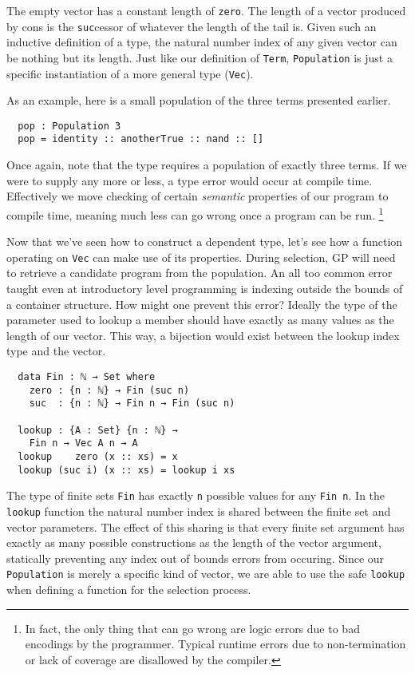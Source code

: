 \documentclass{acm_proc_article-sp}
\begin{document}
The empty vector has a constant length of \texttt{zero}. The length of a vector
produced by cons is the \texttt{suc}cessor of whatever the length of
the tail is. Given such an inductive definition of a type, the natural
number index of any given vector can be nothing but its length. Just
like our definition of \texttt{Term}, \texttt{Population} is just a
specific instantiation of a more general type (\texttt{Vec}).

As an example, here is a small population of the three terms presented
earlier.

\begin{verbatim}
  pop : Population 3
  pop = identity :: anotherTrue :: nand :: []
\end{verbatim}

Once again, note that the type requires a population of exactly three
terms. If we were to supply any more or less, a type error would occur at
compile time. Effectively we move checking of certain \textit{semantic}
properties of our program to compile time, meaning much less can go
wrong once a program can be run.
\footnote{In fact, the only thing
  that can go wrong are logic errors due to bad encodings by the
  programmer. Typical runtime errors due to non-termination or lack of
  coverage are disallowed by the compiler.}

Now that we've seen how to construct a dependent type, let's see how
a function operating on \texttt{Vec} can make use of its properties.
During selection, GP will need to retrieve a candidate program from
the population. An all too common error taught even at introductory
level programming is indexing outside the bounds of a container
structure. How might one prevent this error? Ideally the type of the
parameter used to lookup a member should have exactly as many values
as the length of our vector. This way, a bijection would exist between
the lookup index type and the vector.

\begin{verbatim}
  data Fin : ℕ → Set where
    zero : {n : ℕ} → Fin (suc n)
    suc  : {n : ℕ} → Fin n → Fin (suc n)

  lookup : {A : Set} {n : ℕ} →
    Fin n → Vec A n → A
  lookup    zero (x :: xs) = x
  lookup (suc i) (x :: xs) = lookup i xs
\end{verbatim}

The type of finite sets \texttt{Fin} has exactly \texttt{n} possible
values for any \texttt{Fin n}. In the \texttt{lookup} function the
natural number index is shared between the finite set and vector
parameters. The effect of this sharing is that every finite set
argument has exactly as many possible constructions as the length of
the vector argument, statically preventing any index out of bounds
errors from occuring. Since our \texttt{Population} is merely a
specific kind of vector, we are able to use the safe \texttt{lookup}
when defining a function for the selection process.
\end{document}
